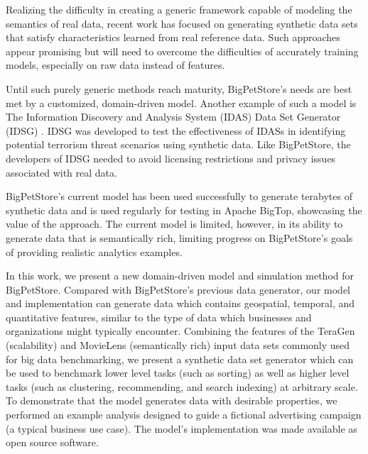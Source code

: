 \documentclass[conference]{IEEEtran}
\begin{document}
Realizing the difficulty in creating a generic framework capable of modeling the semantics of real data, recent work\cite{Alexandrov2013} has focused on generating synthetic data sets that satisfy characteristics learned from real reference data. Such approaches appear promising but will need to overcome the difficulties of accurately training models, especially on raw data instead of features.

Until such purely generic methods reach maturity, BigPetStore's needs are best met by a customized, domain-driven model. Another example of such a model is The Information Discovery and Analysis System (IDAS) Data Set Generator (IDSG) \cite{Jeske2005,Lin2006}. IDSG was developed to test the effectiveness of IDASs in identifying potential terrorism threat scenarios using synthetic data.  Like BigPetStore, the developers of IDSG needed to avoid licensing restrictions and privacy issues associated with real data.



BigPetStore's current model has been used successfully to generate terabytes of synthetic data and is used regularly for testing in Apache BigTop, showcasing the value of the approach.  The current model is limited, however, in its ability to generate data that is semantically rich, limiting progress on BigPetStore's goals of providing realistic analytics examples.

In this work, we present a new domain-driven model and simulation method for BigPetStore.  Compared with BigPetStore's previous data generator, our model and implementation can generate data which contains geospatial, temporal, and quantitative features, similar to the type of data which businesses and organizations might typically encounter.  Combining the features of the TeraGen (scalability)  and MovieLens \cite{MovieLens} (semantically rich) input data sets commonly used for big data benchmarking, we present a synthetic data set generator which can be used to benchmark lower level tasks (such as sorting) as well as higher level tasks (such as clustering, recommending, and search indexing) at arbitrary scale.  To demonstrate that the model generates data with desirable properties, we performed an example analysis designed to guide a fictional advertising campaign (a typical business use case). The model's implementation was made available as open source software.
\end{document}

